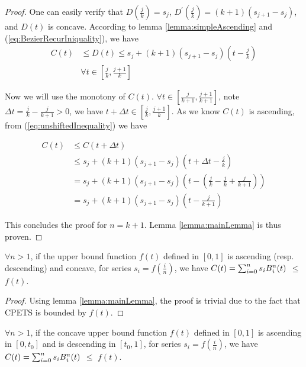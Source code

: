 \begin{proof}
One can easily verify that $D(\frac{j}{k}) = s_{j}$, $D^{\prime}(\frac{j}{k}) = (k+1)(s_{j+1}-s_{j})$, and $D(t)$ is concave. According to lemma \ref{lemma:simpleAscending} and (\ref{eq:BezierRecurIniquality}), we have
\begin{equation}\begin{split}
C(t) &\le D(t) \le s_{j}+(k+1)(s_{j+1}-s_{j})(t-\frac{j}{k}) \\
& \forall t \in \left[\frac{j}{k}, \frac{j+1}{k}\right]
\label{eq:unshiftedInequality}
\end{split}\end{equation}

Now we will use the monotony of $C(t)$. $\forall t \in \left[\frac{j}{k+1}, \frac{j+1}{k+1}\right]$, note $\Delta t = \frac{j}{k} - \frac{j}{k+1} > 0$, we have $t+\Delta t \in \left[\frac{j}{k}, \frac{j+1}{k}\right]$. As we know $C(t)$ is ascending, from (\ref{eq:unshiftedInequality}) we have

\begin{equation}\begin{split}
C(t) &\le C(t+\Delta t) \\
&\le s_{j}+(k+1)(s_{j+1}-s_{j})(t + \Delta t - \frac{j}{k}) \\
&= s_{j}+(k+1)(s_{j+1}-s_{j})(t - (\frac{j}{k} - \frac{j}{k} + \frac{j}{k+1})) \\
&= s_{j}+(k+1)(s_{j+1}-s_{j})(t - \frac{j}{k+1})
\label{eq:shiftedInequality}
\end{split}\end{equation}

This concludes the proof for $n=k+1$. Lemma \ref{lemma:mainLemma} is thus proven.
\end{proof}

\begin{corollary}
$\forall n > 1$, if the upper bound function $f(t)$ defined in $\left[0,1\right]$ is ascending (resp. descending) and concave, for series $s_{i}=f(\frac{i}{n})$, we have $C(t)=\sum_{i=0}^{n}s_{i}B\textsupsub{$n$}{$i$}(t)$ $\le$ $f(t)$.
\label{corollary:monotoneLowerThanFt}
\end{corollary}

\begin{proof}
Using lemma \ref{lemma:mainLemma}, the proof is trivial due to the fact that CPETS is bounded by $f(t)$.
\end{proof}

\begin{lemma}
$\forall n > 1$, if the concave upper bound function $f(t)$ defined in $\left[0,1\right]$ is ascending in $\left[0, t_{0}\right]$ and is descending in $\left[t_{0}, 1\right]$, for series $s_{i}=f(\frac{i}{n})$, we have $C(t)=\sum_{i=0}^{n}s_{i}B\textsupsub{$n$}{$i$}(t)$ $\le$ $f(t)$.
\label{lemma:ascendingNdescending}
\end{lemma}

